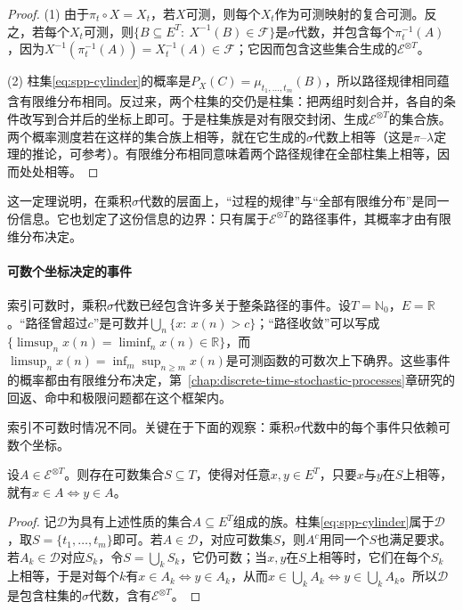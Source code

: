 \begin{proof}
(1) 由于$\pi_t\circ X=X_t$，若$X$可测，则每个$X_t$作为可测映射的复合可测。反之，若每个$X_t$可测，则$\{B\subseteq E^T:\ X^{-1}(B)\in\mathcal F\}$是$\sigma$代数，并包含每个$\pi_t^{-1}(A)$，因为$X^{-1}(\pi_t^{-1}(A))=X_t^{-1}(A)\in\mathcal F$；它因而包含这些集合生成的$\mathcal E^{\otimes T}$。

(2) 柱集\eqref{eq:spp-cylinder}的概率是$P_X(C)=\mu_{t_1,\ldots,t_m}(B)$，所以路径规律相同蕴含有限维分布相同。反过来，两个柱集的交仍是柱集：把两组时刻合并，各自的条件改写到合并后的坐标上即可。于是柱集族是对有限交封闭、生成$\mathcal E^{\otimes T}$的集合族。两个概率测度若在这样的集合族上相等，就在它生成的$\sigma$代数上相等（这是$\pi$--$\lambda$定理的推论，可参考）。有限维分布相同意味着两个路径规律在全部柱集上相等，因而处处相等。
\end{proof}

这一定理说明，在乘积$\sigma$代数的层面上，“过程的规律”与“全部有限维分布”是同一份信息。它也划定了这份信息的边界：只有属于$\mathcal E^{\otimes T}$的路径事件，其概率才由有限维分布决定。

\paragraph{可数个坐标决定的事件}
索引可数时，乘积$\sigma$代数已经包含许多关于整条路径的事件。设$T=\mathbb N_0$，$E=\mathbb R$。“路径曾超过$c$”是可数并$\bigcup_n\{x:\ x(n)>c\}$；“路径收敛”可以写成$\{\limsup_nx(n)=\liminf_nx(n)\in\mathbb R\}$，而$\limsup_nx(n)=\inf_m\sup_{n\ge m}x(n)$是可测函数的可数次上下确界。这些事件的概率都由有限维分布决定，第~\ref{chap:discrete-time-stochastic-processes}章研究的回返、命中和极限问题都在这个框架内。

索引不可数时情况不同。关键在于下面的观察：乘积$\sigma$代数中的每个事件只依赖可数个坐标。

\begin{theorem}
\label{thm:spp-countable-coordinates}
设$A\in\mathcal E^{\otimes T}$。则存在可数集合$S\subseteq T$，使得对任意$x,y\in E^T$，只要$x$与$y$在$S$上相等，就有$x\in A\Leftrightarrow y\in A$。
\end{theorem}

\begin{proof}
记$\mathcal D$为具有上述性质的集合$A\subseteq E^T$组成的族。柱集\eqref{eq:spp-cylinder}属于$\mathcal D$，取$S=\{t_1,\ldots,t_m\}$即可。若$A\in\mathcal D$，对应可数集$S$，则$A^c$用同一个$S$也满足要求。若$A_k\in\mathcal D$对应$S_k$，令$S=\bigcup_kS_k$，它仍可数；当$x,y$在$S$上相等时，它们在每个$S_k$上相等，于是对每个$k$有$x\in A_k\Leftrightarrow y\in A_k$，从而$x\in\bigcup_kA_k\Leftrightarrow y\in\bigcup_kA_k$。所以$\mathcal D$是包含柱集的$\sigma$代数，含有$\mathcal E^{\otimes T}$。
\end{proof}

